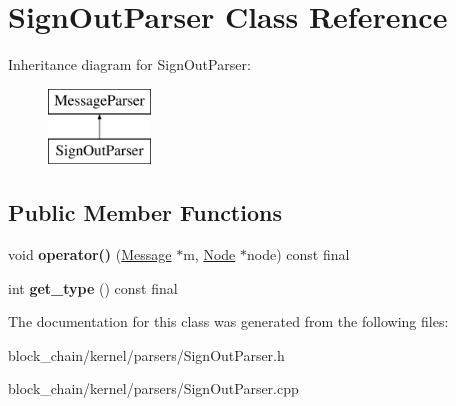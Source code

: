 \hypertarget{classSignOutParser}{}\section{Sign\+Out\+Parser Class Reference}
\label{classSignOutParser}
Inheritance diagram for Sign\+Out\+Parser\+:\begin{figure}[H]
\begin{center}
\leavevmode
\includegraphics[height=2.000000cm]{classSignOutParser}
\end{center}
\end{figure}
\subsection*{Public Member Functions}
\begin{DoxyCompactItemize}
\item 
\mbox{\label{classSignOutParser_a29ec80b982d783c10d46a431947bb319}} 
void {\bfseries operator()} (\mbox{\hyperlink{classMessage}{Message}} $\ast$m, \mbox{\hyperlink{classNode}{Node}} $\ast$node) const final
\item 
\mbox{\label{classSignOutParser_afe949de785ce36746d69e19515a72d24}} 
int {\bfseries get\+\_\+type} () const final
\end{DoxyCompactItemize}


The documentation for this class was generated from the following files\+:\begin{DoxyCompactItemize}
\item 
block\+\_\+chain/kernel/parsers/Sign\+Out\+Parser.\+h\item 
block\+\_\+chain/kernel/parsers/Sign\+Out\+Parser.\+cpp\end{DoxyCompactItemize}
